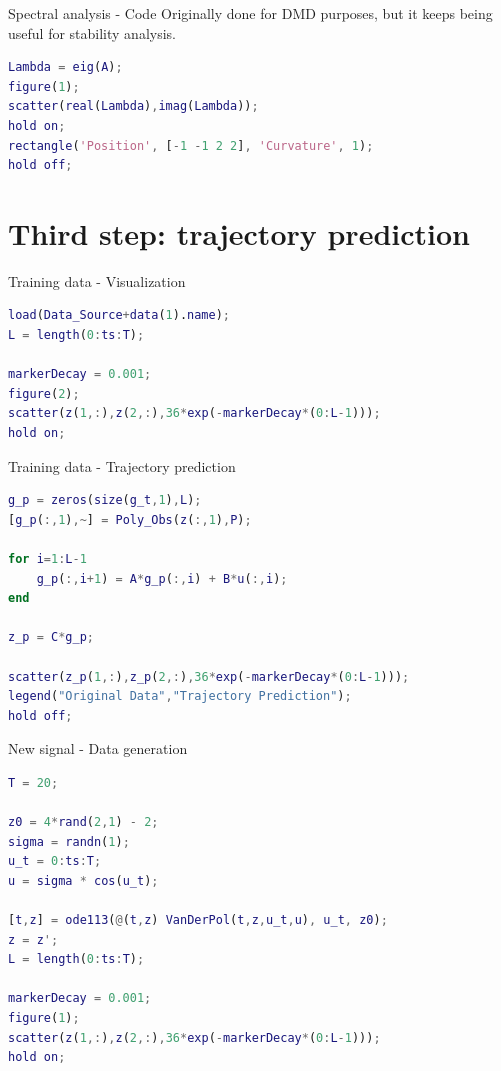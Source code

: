 \documentclass{beamer}
\begin{document}
\begin{frame}[fragile]{Spectral analysis - Code}
    Originally done for DMD purposes, but it keeps being useful for stability analysis.

    \begin{lstlisting}[language=Matlab]
Lambda = eig(A);
figure(1);
scatter(real(Lambda),imag(Lambda));
hold on;
rectangle('Position', [-1 -1 2 2], 'Curvature', 1);
hold off;
    \end{lstlisting}
\end{frame}


\section{Third step: trajectory prediction}

\begin{frame}[fragile]{Training data - Visualization}
    \begin{lstlisting}[language=Matlab]
load(Data_Source+data(1).name);
L = length(0:ts:T);

markerDecay = 0.001;
figure(2);
scatter(z(1,:),z(2,:),36*exp(-markerDecay*(0:L-1)));
hold on;
    \end{lstlisting}
\end{frame}

\begin{frame}[fragile]{Training data - Trajectory prediction}
    \begin{lstlisting}[language=Matlab]
g_p = zeros(size(g_t,1),L);
[g_p(:,1),~] = Poly_Obs(z(:,1),P);

for i=1:L-1
    g_p(:,i+1) = A*g_p(:,i) + B*u(:,i);
end

z_p = C*g_p;

scatter(z_p(1,:),z_p(2,:),36*exp(-markerDecay*(0:L-1)));
legend("Original Data","Trajectory Prediction");
hold off;
    \end{lstlisting}
\end{frame}

\begin{frame}[fragile]{New signal - Data generation}
    \begin{lstlisting}[language=matlab]
T = 20;

z0 = 4*rand(2,1) - 2;
sigma = randn(1);
u_t = 0:ts:T;
u = sigma * cos(u_t);

[t,z] = ode113(@(t,z) VanDerPol(t,z,u_t,u), u_t, z0);
z = z';
L = length(0:ts:T);

markerDecay = 0.001;
figure(1);
scatter(z(1,:),z(2,:),36*exp(-markerDecay*(0:L-1)));
hold on;
    \end{lstlisting}
\end{frame}
\end{document}
